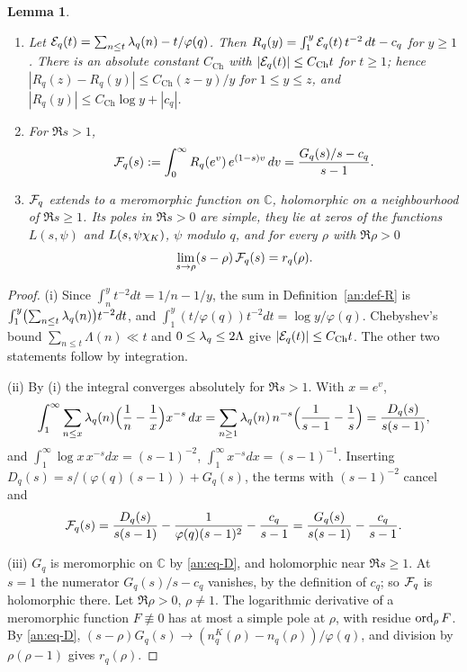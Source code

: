 \documentclass[10pt]{amsart}
\newtheorem{lemma}[theorem]{Lemma}
\theoremstyle{definition}
\theoremstyle{remark}
\begin{document}
\begin{lemma}\label{an:lem-R}
\begin{enumerate}
\item[(i)] Let $\mathcal E_q(t)=\sum_{n\le t}\lambda_q(n)-t/\varphi(q)$. Then
$R_q(y)=\int_1^{y}\mathcal E_q(t)\,t^{-2}\,dt-c_q$ for $y\ge1$. There is an
absolute constant $C_{\mathrm{Ch}}$ with $|\mathcal E_q(t)|\le C_{\mathrm{Ch}}t$ for $t\ge1$; hence
$|R_q(z)-R_q(y)|\le C_{\mathrm{Ch}}(z-y)/y$ for $1\le y\le z$, and
$|R_q(y)|\le C_{\mathrm{Ch}}\log y+|c_q|$.
\item[(ii)] For $\Re s>1$,
\[
 \mathcal F_q(s):=\int_0^\infty R_q(e^{v})\,e^{(1-s)v}\,dv=\frac{G_q(s)/s-c_q}{s-1}.
\]
\item[(iii)] $\mathcal F_q$ extends to a meromorphic function on $\mathbb C$,
holomorphic on a neighbourhood of $\Re s\ge1$. Its poles in $\Re s>0$ are
simple, they lie at zeros of the functions $L(s,\psi)$ and $L(s,\psi\chi_K)$,
$\psi$ modulo $q$, and for every $\rho$ with $\Re\rho>0$
\[
 \lim_{s\to\rho}(s-\rho)\,\mathcal F_q(s)=r_q(\rho).
\]
\end{enumerate}
\end{lemma}
\begin{proof}
(i) Since $\int_n^{y}t^{-2}dt=1/n-1/y$, the sum in
Definition~\ref{an:def-R} is $\int_1^{y}\bigl(\sum_{n\le t}\lambda_q(n)\bigr)t^{-2}dt$,
and $\int_1^{y}(t/\varphi(q))t^{-2}dt=\log y/\varphi(q)$. Chebyshev's bound
$\sum_{n\le t}\Lambda(n)\ll t$ and $0\le\lambda_q\le2\Lambda$ give
$|\mathcal E_q(t)|\le C_{\mathrm{Ch}}t$. The other two statements follow by integration.

(ii) By (i) the integral converges absolutely for $\Re s>1$. With $x=e^{v}$,
\[
 \int_1^\infty\sum_{n\le x}\lambda_q(n)\Bigl(\frac1n-\frac1x\Bigr)x^{-s}\,dx
 =\sum_{n\ge1}\lambda_q(n)\,n^{-s}\Bigl(\frac1{s-1}-\frac1s\Bigr)=\frac{D_q(s)}{s(s-1)},
\]
and $\int_1^\infty\log x\,x^{-s}dx=(s-1)^{-2}$,
$\int_1^\infty x^{-s}dx=(s-1)^{-1}$. Inserting
$D_q(s)=s/(\varphi(q)(s-1))+G_q(s)$, the terms with $(s-1)^{-2}$ cancel and
\[
 \mathcal F_q(s)=\frac{D_q(s)}{s(s-1)}-\frac1{\varphi(q)(s-1)^2}-\frac{c_q}{s-1}
 =\frac{G_q(s)}{s(s-1)}-\frac{c_q}{s-1}.
\]

(iii) $G_q$ is meromorphic on $\mathbb C$ by \eqref{an:eq-D}, and holomorphic
near $\Re s\ge1$. At $s=1$ the numerator $G_q(s)/s-c_q$ vanishes, by the
definition of $c_q$; so $\mathcal F_q$ is holomorphic there. Let $\Re\rho>0$,
$\rho\ne1$. The logarithmic derivative of a meromorphic function $F\not\equiv0$ has
at most a simple pole at $\rho$, with residue $\operatorname{ord}_\rho F$. By
\eqref{an:eq-D}, $(s-\rho)G_q(s)\to(n_q^K(\rho)-n_q(\rho))/\varphi(q)$, and
division by $\rho(\rho-1)$ gives $r_q(\rho)$.
\end{proof}
\end{document}
